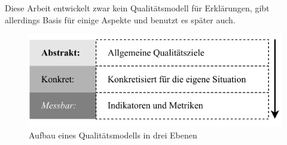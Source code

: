 Diese Arbeit entwickelt zwar kein Qualitätsmodell für Erklärungen, gibt allerdings Basis für einige Aspekte und benutzt es später auch.

\begin{figure}[htb!]
    \centering
    \includegraphics{contents/02_basics/res/quality_models.pdf}
    \caption{Aufbau eines Qualitätsmodells in drei Ebenen \cite[S. 34, ][]{schneider2012abenteuer}}
    \label{fig:basics_quality_models}
\end{figure}

\cite{schneider2012abenteuer}